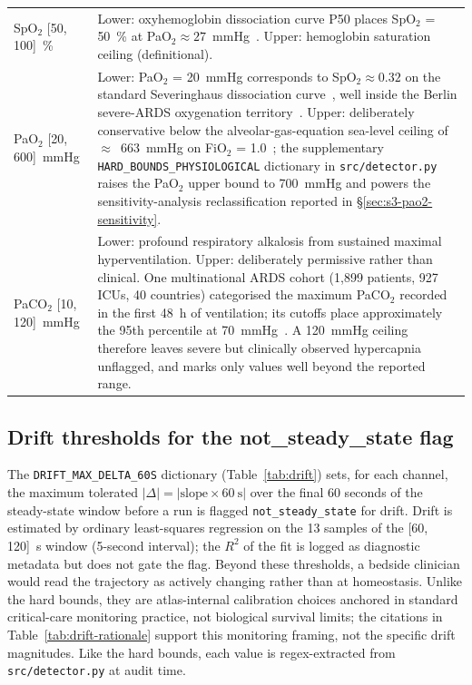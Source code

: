 \documentclass[pdflatex,sn-nature]{sn-jnl}%
\begin{document}
\begin{table}[htbp]
\begin{tabular}{lp{}}
SpO$_2$ [50, 100]~\% &
Lower: oxyhemoglobin dissociation curve P50 places SpO$_2$ = 50~\% at PaO$_2 \approx 27$~mmHg~\cite{severinghaus1979}. Upper: hemoglobin saturation ceiling (definitional). \\
PaO$_2$ [20, 600]~mmHg &
Lower: PaO$_2$ = 20~mmHg corresponds to SpO$_2 \approx 0.32$ on the standard Severinghaus dissociation curve~\cite{severinghaus1979}, well inside the Berlin severe-ARDS oxygenation territory~\cite{ards2012}. Upper: deliberately conservative below the alveolar-gas-equation sea-level ceiling of $\approx$~663~mmHg on FiO$_2$ = 1.0~\cite[Ch.~5]{west2020respiratory}; the supplementary \texttt{HARD\_BOUNDS\_PHYSIOLOGICAL} dictionary in \texttt{src/detector.py} raises the PaO$_2$ upper bound to 700~mmHg and powers the sensitivity-analysis reclassification reported in \S\ref{sec:s3-pao2-sensitivity}. \\
PaCO$_2$ [10, 120]~mmHg &
Lower: profound respiratory alkalosis from sustained maximal hyperventilation. Upper: deliberately permissive rather than clinical. One multinational ARDS cohort (1{,}899 patients, 927 ICUs, 40 countries) categorised the maximum PaCO$_2$ recorded in the first 48~h of ventilation; its cutoffs place approximately the 95th percentile at 70~mmHg~\cite{nin2017}. A 120~mmHg ceiling therefore leaves severe but clinically observed hypercapnia unflagged, and marks only values well beyond the reported range. \\
\bottomrule
\end{tabular}
\end{table}

\subsection{Drift thresholds for the not\_steady\_state flag}\label{sec:s3-drift}

The \texttt{DRIFT\_MAX\_DELTA\_60S} dictionary (Table~\ref{tab:drift}) sets, for each channel, the maximum tolerated $|\Delta| = |\text{slope} \times 60~\text{s}|$ over the final 60 seconds of the steady-state window before a run is flagged \texttt{not\_steady\_state} for drift. Drift is estimated by ordinary least-squares regression on the 13 samples of the [60, 120]~s window (5-second interval); the $R^2$ of the fit is logged as diagnostic metadata but does not gate the flag. Beyond these thresholds, a bedside clinician would read the trajectory as actively changing rather than at homeostasis. Unlike the hard bounds, they are atlas-internal calibration choices anchored in standard critical-care monitoring practice, not biological survival limits; the citations in Table~\ref{tab:drift-rationale} support this monitoring framing, not the specific drift magnitudes. Like the hard bounds, each value is regex-extracted from \texttt{src/detector.py} at audit time.
\end{document}
